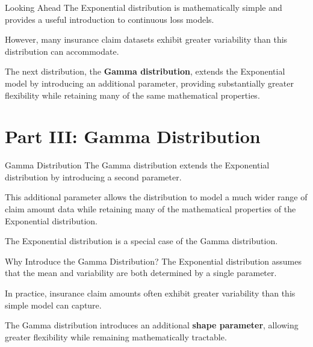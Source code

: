 \documentclass[
  ignorenonframetext,
  aspectratio=169,
]{beamer}
\begin{document}
\begin{frame}{Looking Ahead}
\protect{}\label{looking-ahead}
The Exponential distribution is mathematically simple and provides a
useful introduction to continuous loss models.

However, many insurance claim datasets exhibit greater variability than
this distribution can accommodate.

The next distribution, the \textbf{Gamma distribution}, extends the
Exponential model by introducing an additional parameter, providing
substantially greater flexibility while retaining many of the same
mathematical properties.
\end{frame}

\section{Part III: Gamma
Distribution}\label{part-iii-gamma-distribution}

\begin{frame}{Gamma Distribution}
\protect{}\label{gamma-distribution}
The Gamma distribution extends the Exponential distribution by
introducing a second parameter.

This additional parameter allows the distribution to model a much wider
range of claim amount data while retaining many of the mathematical
properties of the Exponential distribution.

\begin{tcolorbox}[enhanced jigsaw, arc=.35mm, bottomrule=.15mm, bottomtitle=1mm, breakable, colback=white, colbacktitle=quarto-callout-note-color!10!white, colframe=quarto-callout-note-color-frame, coltitle=black, left=2mm, leftrule=.75mm, opacityback=0, opacitybacktitle=0.6, rightrule=.15mm, title=\textcolor{quarto-callout-note-color}{\faInfo}\hspace{0.5em}{Key Idea}, titlerule=0mm, toprule=.15mm, toptitle=1mm]

The Exponential distribution is a special case of the Gamma
distribution.

\end{tcolorbox}
\end{frame}

\begin{frame}{Why Introduce the Gamma Distribution?}
\protect{}\label{why-introduce-the-gamma-distribution}
The Exponential distribution assumes that the mean and variability are
both determined by a single parameter.

In practice, insurance claim amounts often exhibit greater variability
than this simple model can capture.

The Gamma distribution introduces an additional \textbf{shape
parameter}, allowing greater flexibility while remaining mathematically
tractable.
\end{frame}
\end{document}

